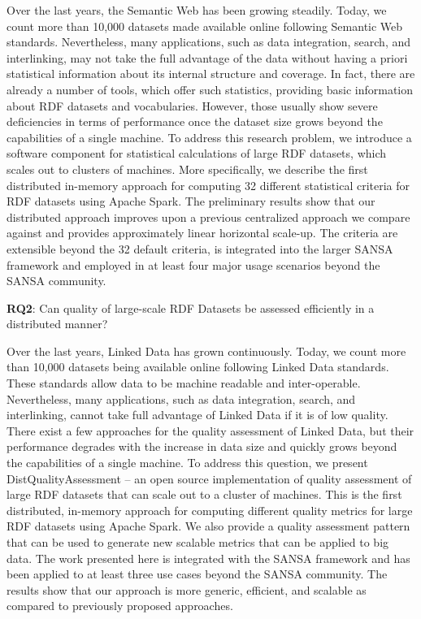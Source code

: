 Over the last years, the Semantic Web has been growing steadily. Today, we count more than 10,000 datasets made available online following Semantic Web standards.
Nevertheless, many applications, such as data integration, search, and interlinking, may not take the full advantage of the data without having a priori statistical information about its internal structure and coverage.
In fact, there are already a number of tools, which offer such statistics, providing basic information about \gls{RDF} datasets and vocabularies.
However, those usually show severe deficiencies in terms of performance once the dataset size grows beyond the capabilities of a single machine.
To address this research problem, we introduce a software component for statistical calculations of large RDF datasets, which scales out to clusters of machines.
More specifically, we describe the first distributed in-memory approach for computing 32 different statistical criteria for \gls{RDF} datasets using Apache Spark.
The preliminary results show that our distributed approach improves upon a previous centralized approach we compare against and provides approximately linear horizontal scale-up. 
The criteria are extensible beyond the 32 default criteria, is integrated into the larger SANSA framework and employed in at least four major usage scenarios beyond the SANSA community.

\begin{tcolorbox}
\textbf{RQ2}: Can quality of large-scale RDF Datasets be assessed efficiently in a distributed manner?
\end{tcolorbox}

Over the last years, Linked Data has grown continuously. 
Today, we count more than 10,000 datasets being available online following Linked Data standards. 
These standards allow data to be machine readable and inter-operable.  
Nevertheless, many applications, such as data integration, search, and interlinking, cannot take full advantage of Linked Data if it is of low quality.
There exist a few approaches for the quality assessment of Linked Data, but their performance degrades with the increase in data size and quickly grows beyond the capabilities of a single machine.
To address this question, we present DistQualityAssessment -- an open source implementation of quality assessment of large RDF datasets that can scale out to a cluster of machines.
This is the first distributed, in-memory approach for computing different quality metrics for large \gls{RDF} datasets using Apache Spark. We also provide a quality assessment pattern that can be used to generate new scalable metrics that can be applied to big data.
The work presented here is integrated with the SANSA framework and has been applied to at least three use cases beyond the SANSA community.   
The results show that our approach is more generic, efficient, and scalable as compared to previously proposed approaches.

